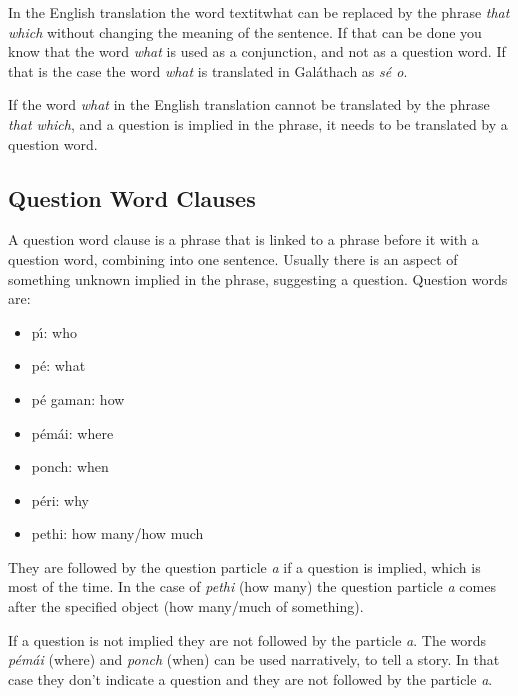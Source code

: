 In the English translation the word textit{what} can be replaced by the phrase \textit{that which} without changing the meaning of the sentence. If that can be done you know that the word \textit{what} is used as a conjunction, and not as a question word. If that is the case the word \textit{what} is translated in Gal\'{a}thach as \textit{s\'{e} o}.

If the word \textit{what} in the English translation cannot be translated by the phrase \textit{that which}, and a question is implied in the phrase, it needs to be translated by a question word.

\subsection{Question Word Clauses}

A question word clause is a phrase that is linked to a phrase before it with a question word, combining into one sentence. Usually there is an aspect of something unknown implied in the phrase, suggesting a question. Question words are:

\begin{itemize}
  \item p\'{\i}: who
  \item p\'{e}: what
  \item p\'{e} gaman: how
  \item p\'{e}m\'{a}i: where
  \item ponch: when
  \item p\'{e}ri: why
  \item pethi: how many/how much
\end{itemize}

They are followed by the question particle \textit{a} if a question is implied, which is most of the time. In the case of \textit{pethi} (how many) the question particle \textit{a} comes after the specified object (how many/much of something).

If a question is not implied they are not followed by the particle \textit{a}. The words \textit{p\'{e}m\'{a}i} (where) and \textit{ponch} (when) can be used narratively, to tell a story. In that case they don't indicate a question and they are not followed by the particle \textit{a}.

